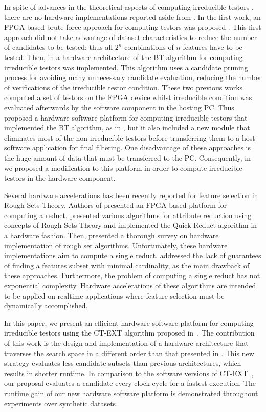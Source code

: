 \documentclass[authoryear,preprint,review,12pt]{elsarticle}
\begin{document}
In spite of advances in the theoretical aspects of computing
irreducible testors \citep{R5,R8,R9}, there are 
no hardware implementations reported aside from \citep{R10,R11,R21}.
In the first work, an FPGA-based brute force approach for computing testors was proposed
\citep{R10}. This first approach did not take advantage of dataset characteristics to reduce the number 
of candidates to be tested; thus all $2^n$ combinations of $n$ features have to be tested. 
Then, in \citep{R11} a hardware architecture of the BT algorithm for computing irreducible testors was implemented. 
This algorithm uses a candidate pruning process for avoiding many unnecessary candidate evaluation, 
reducing the number of verifications of the irreducible testor condition. 
These two previous works computed a set of testors on the FPGA device whilst irreducible condition 
was evaluated afterwards by the software component in the hosting PC. 
Thus \cite{R21} proposed a hardware software platform for computing irreducible testors that 
implemented the BT algorithm, as in \citep{R11}, but it also included a new module that eliminates most of 
the non irreducible testors before transferring them to a host software application for final filtering. 
One disadvantage of these approaches is the huge amount of data that must be transferred to the PC.  
Consequently, in~\citep{Rod14} we proposed a modification to this platform in order to compute irreducible 
testors in the hardware component. 

Several hardware accelerations has been recently reported for feature selection in Rough Sets Theory. Authors of
\citep{Grze13,Kop14} presented an FPGA based platform for computing a reduct. \cite{Tiwari13} presented various
algorithms for attribute reduction using concepts of Rough Sets Theory and implemented the Quick Reduct
algorithm in a hardware fashion. Then, \cite{Tiwari14} presented a thorough survey on hardware implementation 
of rough set algorithms. Unfortunately, these hardware implementations aim to compute a single reduct. 
\cite{Jensen14} addressed the lack of guarantees of finding a features subset with minimal cardinality, as the
main drawback of these approaches. Furthermore, the problem of computing a single reduct has not exponential
complexity. Hardware accelerations of these algorithms are intended to be applied on realtime applications
where feature selection must be dynamically accomplished.

In this paper, we present an efficient hardware software platform for computing irreducible
testors using the CT-EXT algorithm proposed in~\citep{R22}. The contribution of this
work is the design and implementation of a hardware architecture that traverses the search space in a 
different order than that presented in \citep{R11, R21,Rod14}. This new strategy evaluates less candidate
subsets than previous architectures, which results in shorter runtime. In comparison to the 
software versions of CT-EXT~\citep{R22, R23}, our proposal evaluates a candidate every clock cycle for
a fastest execution. The runtime gain of our new hardware software platform is demonstrated throughout
experiments over synthetic datasets. 
\end{document}

